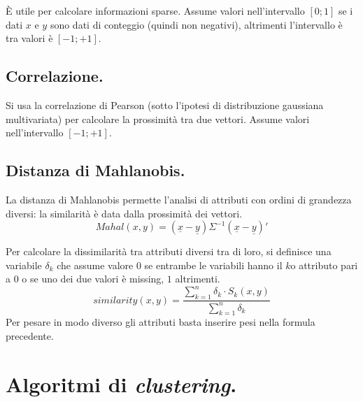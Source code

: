 \documentclass[11pt, a4page, twocolumn]{article}
\begin{document}
È utile per calcolare informazioni sparse.
Assume valori nell'intervallo $[0;1]$ se i dati $x$ e $y$ sono dati di conteggio (quindi non negativi), altrimenti l'intervallo è tra valori è $[-1;+1]$.

\subsection{Correlazione.}
Si usa la correlazione di Pearson (sotto l'ipotesi di distribuzione gaussiana multivariata) per calcolare la prossimità tra due vettori.
Assume valori nell'intervallo $[-1;+1]$.

\subsection{Distanza di Mahlanobis.}
La distanza di Mahlanobis permette l'analisi di attributi con ordini di grandezza diversi: la similarità è data dalla prossimità dei vettori.
\begin{equation*}
Mahal(x, y) = (\underline{x} - \underline{y})\Sigma^{-1}(\underline{x} - \underline{y})'
\end{equation*}

Per calcolare la dissimilarità tra attributi diversi tra di loro, si definisce una variabile $\delta_k$ che assume valore $0$ se entrambe le variabili hanno il $k$o attributo pari a $0$ o se uno dei due valori è missing, $1$ altrimenti.
\begin{equation*}
similarity(x, y) = \frac{\sum^{n}_{k=1}{\delta_k \cdot S_k(x, y)}}{\sum^{n}_{k=1}{\delta_k}}
\end{equation*}
Per pesare in modo diverso gli attributi basta inserire pesi nella formula precedente.


\section{Algoritmi di \textit{clustering}.}
\end{document}
